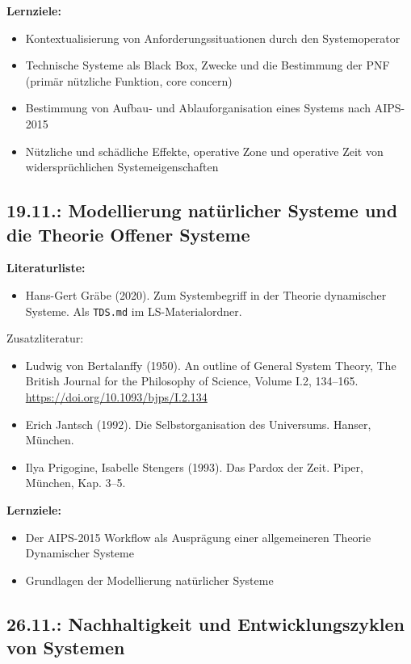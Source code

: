 \documentclass[11pt,a4paper]{article}
\begin{document}
\textbf{Lernziele:}
\begin{itemize}[noitemsep]
\item Kontextualisierung von Anforderungssituationen durch den Systemoperator 
\item Technische Systeme als Black Box, Zwecke und die Bestimmung der PNF
  (primär nützliche Funktion, core concern)
\item Bestimmung von Aufbau- und Ablauforganisation eines Systems nach
  AIPS-2015 
\item Nützliche und schädliche Effekte, operative Zone und operative Zeit von
  widersprüch\-lichen Systemeigenschaften
\end{itemize}

\subsection{19.11.: Modellierung natürlicher Systeme und die Theorie Offener
  Systeme}

\textbf{Literaturliste:}
\begin{itemize}
\item Hans-Gert Gräbe (2020).  Zum Systembegriff in der Theorie dynamischer
  Systeme.  Als \texttt{TDS.md} im LS-Materialordner.
\end{itemize}
Zusatzliteratur:
\begin{itemize}[noitemsep]
\item Ludwig von Bertalanffy (1950). An outline of General System Theory, The
  British Journal for the Philosophy of Science, Volume I.2, 134–165.\\
  \url{https://doi.org/10.1093/bjps/I.2.134}
\item Erich Jantsch (1992). Die Selbstorganisation des Universums. Hanser,
  München.
\item Ilya Prigogine, Isabelle Stengers (1993). Das Pardox der Zeit. Piper,
  München, Kap. 3--5.
\end{itemize}

\textbf{Lernziele:}
\begin{itemize}[noitemsep]
\item Der AIPS-2015 Workflow als Ausprägung einer allgemeineren Theorie
  Dynamischer Systeme 
\item Grundlagen der Modellierung natürlicher Systeme
\end{itemize}

\subsection{26.11.: Nachhaltigkeit und Entwicklungszyklen von Systemen}
\end{document}
